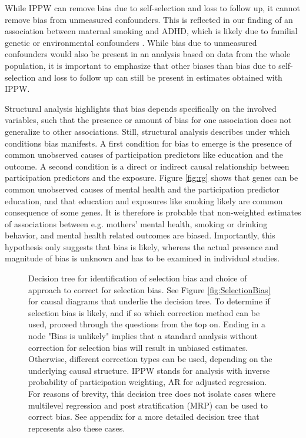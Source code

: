 \documentclass[12pt]{article}
\begin{document}
While IPPW can remove bias due to self-selection and loss to follow up, it cannot remove bias from unmeasured confounders. This is reflected in our finding of an association between maternal smoking and ADHD, which is likely due to familial genetic or environmental confounders \cite{Donovan2011-me}. While bias due to unmeasured confounders would also be present in an analysis based on data from the whole population, it is important to emphasize that other biases than bias due to self-selection and loss to follow up can still be present in estimates obtained with IPPW.  

Structural analysis highlights that bias depends specifically on the involved variables, such that the presence or amount of bias for one association does not generalize to other associations. Still, structural analysis describes under which conditions bias manifests. A first condition for bias to emerge is the presence of common unobserved causes of participation predictors like education and the outcome. A second condition is a direct or indirect causal relationship between participation predictors and the exposure. Figure \ref{fig:rg} shows that genes can be common unobserved causes of mental health and the participation predictor education, and that education and exposures like smoking likely are common consequence of some genes. It is therefore is probable that non-weighted estimates of associations between e.g. mothers' mental health, smoking or drinking behavior, and mental health related outcomes are biased. Importantly, this hypothesis only suggests that bias is likely, whereas the actual presence and magnitude of bias is unknown and has to be examined in individual studies. 

\begin{figure}
	\centering
	\begin{singlespace}
    \end{singlespace}
	
	\caption{Decision tree for identification of selection bias and choice of approach to correct for selection bias. See Figure \ref{fig:SelectionBias} for causal diagrams that underlie the decision tree. 
	To determine if selection bias is likely, and if so which correction method can be used, proceed through the questions from the top on. Ending in a node "Bias is unlikely" implies that a standard analysis without correction for selection bias will result in unbiased estimates. Otherwise, different correction types can be used, depending on the underlying causal structure. IPPW stands for analysis with inverse probability of participation weighting, AR for adjusted regression. For reasons of brevity, this decision tree does not isolate cases where multilevel regression and post stratification (MRP) can be used to correct bias. See appendix for a more detailed decision tree that represents also these cases.}
	\label{fig:DecisionTree}
\end{figure}
\end{document}
